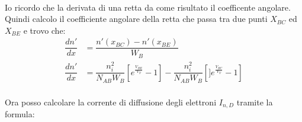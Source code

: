 \hfill
\begin{minipage}{0.25\textwidth}\raggedleft
    \begin{center}
    \end{center}
\end{minipage}
%
\vspace{3mm}\\
%
Io ricordo che la derivata di una retta da come risultato il coefficente angolare. Quindi calcolo il coefficiente angolare della retta che passa tra due punti $X_{BC} $ ed $X_{BE}$ e trovo che:
\begin{align}
   \dfrac{dn'}{dx}&=\dfrac{ n'(x_{BC})-n'(x_{BE})}{W_B} \\
   \dfrac{dn'}{dx} &= \dfrac{n_i^2}{N_{AB}W_B} \left[ e^{\frac{V_{BE}}{V_T}} - 1 \right] -\dfrac{n_i^2}{N_{AB}W_B}\left[] e^{\frac{V_{BC}}{V_T}} - 1 \right]\\
\end{align}

Ora posso calcolare la corrente di diffusione degli elettroni $I_{n,D}$ tramite la formula:

